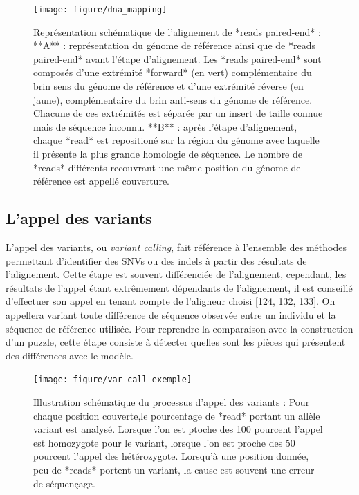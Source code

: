 \documentclass[12pt,twoside]{reedthesis}
\theoremstyle{definition}
\theoremstyle{definition}
\theoremstyle{remark}
\begin{document}
  \begin{figure}
  
  {\centering \texttt{[image: figure/dna\_mapping]} 
  
  }
  
  \caption[Représentation schématique de l'alignement de *reads paired-end*]{Représentation schématique de l'alignement de *reads paired-end* : **A** : représentation du génome de référence ainsi que de *reads paired-end* avant l'étape d'alignement. Les *reads paired-end* sont composés d'une extrémité *forward* (en vert) complémentaire du brin sens du génome de référence et d'une extrémité réverse (en jaune), complémentaire du brin anti-sens du génome de référence. Chacune de ces extrémités est séparée par un insert de taille connue mais de séquence inconnu. **B** : après l'étape d'alignement, chaque *read* est repositioné sur la région du génome avec laquelle il présente la plus grande homologie de séquence. Le nombre de *reads* différents recouvrant une même position du génome de référence est appellé couverture.}\label{fig:picdnamapping}
  \end{figure}
  
  \newpage
  
  \hypertarget{varcall}{\subsection{L'appel des variants}\label{varcall}}
  
  L'appel des variants, ou \emph{variant calling}, fait référence à
  l'ensemble des méthodes permettant d'identifier des SNVs ou des indels à
  partir des résultats de l'alignement. Cette étape est souvent
  différenciée de l'alignement, cependant, les résultats de l'appel étant
  extrêmement dépendants de l'alignement, il est conseillé d'effectuer son
  appel en tenant compte de l'aligneur choisi
  {[}\protect\hyperlink{ref-Nielsen2011}{124},
  \protect\hyperlink{ref-DePristo2011}{132},
  \protect\hyperlink{ref-Lunter2011}{133}{]}. On appellera variant toute
  différence de séquence observée entre un individu et la séquence de
  référence utilisée. Pour reprendre la comparaison avec la construction
  d'un puzzle, cette étape consiste à détecter quelles sont les pièces qui
  présentent des différences avec le modèle.
  
  \begin{figure}
  
  {\centering \texttt{[image: figure/var\_call\_exemple]} 
  
  }
  
  \caption[Illustration schématique du processus d'appel des variants]{Illustration schématique du processus d'appel des variants : Pour chaque position couverte,le pourcentage de *read* portant un allèle variant est analysé. Lorsque l'on est ptoche des 100 pourcent l'appel est homozygote pour le variant, lorsque l'on est proche des 50 pourcent l'appel des hétérozygote. Lorsqu'à une position donnée, peu de *reads* portent un variant, la cause est souvent une erreur de séquençage.}\label{fig:picvarcallprocess}
  \end{figure}
  
\end{document}
